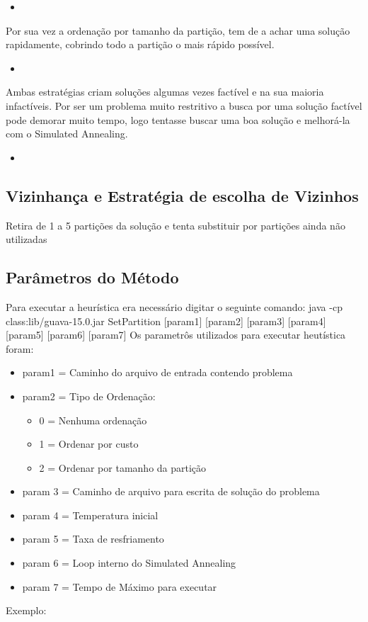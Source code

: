 \documentclass[a4paper, 10pt]{article} %
\newcommand{\insertcode}[2]{\begin{itemize}\item[]\end{itemize}}
\begin{document}
\insertcode{code/SubSetCostComparator.java}{Comparador por Custo}

Por sua vez a ordenação por tamanho da partição, tem de a achar uma solução rapidamente, cobrindo todo a partição o mais rápido possível.

\insertcode{code/SubSetSizeComparator.java}{Comparador por Tamanho da Partição}

Ambas estratégias criam soluções algumas vezes factível e na sua maioria infactíveis. Por
ser um problema muito restritivo a busca por uma solução factível pode demorar muito tempo, logo tentasse buscar uma boa solução e melhorá-la com o Simulated Annealing.

\pagebreak

\insertcode{code/Parsing.java}{Ordenamento no Parsing}



\subsection*{Vizinhança e Estratégia de escolha de Vizinhos}

Retira de 1 a 5 partições da solução e tenta substituir por 
partições ainda não utilizadas


\subsection*{Parâmetros do Método}
Para executar a heurística era necessário digitar o seguinte comando:
java -cp class:lib/guava-15.0.jar SetPartition [param1] [param2] [param3] [param4] [param5]
[param6] [param7] 
Os parametrôs utilizados para executar heutística foram:
\begin{itemize}
	\item param1 = Caminho do arquivo de entrada contendo problema
	\item param2 = Tipo de Ordenação: 
	\begin{itemize}
		\item 0 = Nenhuma ordenação
		\item 1 = Ordenar por custo
		\item 2 = Ordenar por tamanho da partição 
	\end{itemize}	
	\item param 3 = Caminho de arquivo para escrita de solução do problema
	\item param 4 = Temperatura inicial
	\item param 5 = Taxa de resfriamento
	\item param 6 = Loop interno do Simulated Annealing
	\item param 7 = Tempo de Máximo para executar
\end{itemize}
Exemplo: 
\end{document}
